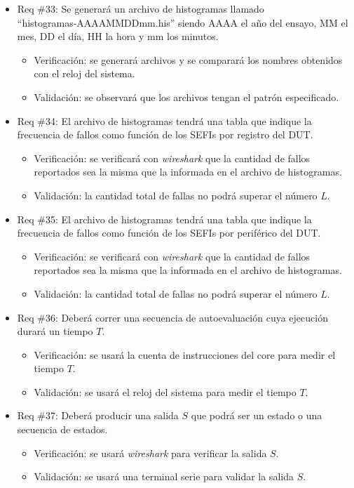 \documentclass[
11pt, %
]{charter}
\begin{document}
\begin{itemize}
\item Req \#33: Se generará un archivo de histogramas llamado\\ ``histogramas-AAAAMMDDmm.his'' siendo AAAA el año del ensayo, MM el mes, DD el día, HH la hora y mm los minutos.
\begin{itemize}
    \item Verificación: se generará archivos y se comparará los nombres obtenidos con el reloj del sistema.
    \item Validación: se observará que los archivos tengan el patrón especificado.
\end{itemize}

\item Req \#34: El archivo de histogramas tendrá una tabla que indique la frecuencia de fallos como función de los SEFIs por registro del DUT.
\begin{itemize}
    \item Verificación: se verificará con \emph{wireshark} que la cantidad de fallos reportados sea la misma que la informada en el archivo de histogramas.
    \item Validación: la cantidad total de fallas no podrá superar el número $ L $.
\end{itemize}

\item Req \#35: El archivo de histogramas tendrá una tabla que indique la frecuencia de fallos como función de los SEFIs por periférico del DUT.
\begin{itemize}
    \item Verificación: se verificará con \emph{wireshark} que la cantidad de fallos reportados sea la misma que la informada en el archivo de histogramas.
    \item Validación: la cantidad total de fallas no podrá superar el número $ L $.
\end{itemize}

\item Req \#36: Deberá correr una secuencia de autoevaluación cuya ejecución durará un tiempo $ T $.
\begin{itemize}
    \item Verificación: se usará la cuenta de instrucciones del core para medir el tiempo $ T $.
    \item Validación: se usará el reloj del sistema para medir el tiempo $ T $.
\end{itemize}

\item Req \#37: Deberá producir una salida $ S $ que podrá ser un estado o una secuencia de estados.
\begin{itemize}
    \item Verificación: se usará \emph{wireshark} para verificar la salida $ S $.
    \item Validación: se usará una terminal serie para validar la salida $ S $.
\end{itemize}


\end{itemize}
\end{document}
